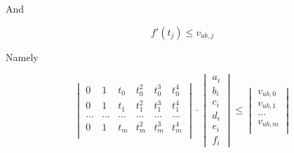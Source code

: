 \documentclass[a4paper,11pt]{article}  %
\begin{document}
And 

$$
f'(t_j) \leq v_{ub,j}
$$

Namely

$$
\begin{vmatrix} 
 0& 1 & t_0 & t_0^2 & t_0^3 & t_0^4 \\
 0 & 1 & t_1 & t_1^2 & t_1^3 & t_1^4 \\
 ...&...&...&...&...&... \\
 0 &1 & t_m & t_m^2 & t_m^3 & t_m^4 \\
 \end{vmatrix} \cdot \begin{vmatrix} a_i \\ b_i \\ c_i \\ d_i \\ e_i \\ f_i \end{vmatrix} 
 \leq
 \begin{vmatrix}
 v_{ub,0}\\
 v_{ub,1}\\
 ...\\
 v_{ub,m}\\
 \end{vmatrix}
$$
\end{document}
